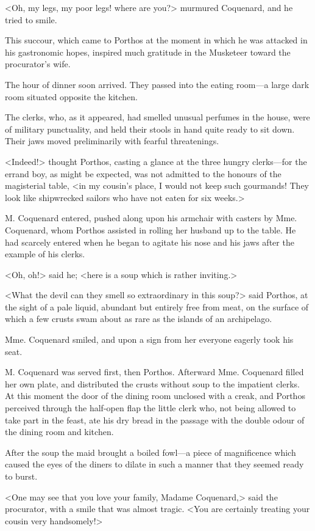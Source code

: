 <Oh, my legs, my poor legs! where are you?> murmured Coquenard, and he tried to smile. 

This succour, which came to Porthos at the moment in which he was attacked in his gastronomic hopes, inspired much gratitude in the Musketeer toward the procurator's wife. 

The hour of dinner soon arrived. They passed into the eating room---a large dark room situated opposite the kitchen. 

The clerks, who, as it appeared, had smelled unusual perfumes in the house, were of military punctuality, and held their stools in hand quite ready to sit down. Their jaws moved preliminarily with fearful threatenings. 

<Indeed!> thought Porthos, casting a glance at the three hungry clerks---for the errand boy, as might be expected, was not admitted to the honours of the magisterial table, <in my cousin's place, I would not keep such gourmands! They look like shipwrecked sailors who have not eaten for six weeks.> 

M. Coquenard entered, pushed along upon his armchair with casters by Mme. Coquenard, whom Porthos assisted in rolling her husband up to the table. He had scarcely entered when he began to agitate his nose and his jaws after the example of his clerks. 

<Oh, oh!> said he; <here is a soup which is rather inviting.> 

<What the devil can they smell so extraordinary in this soup?> said Porthos, at the sight of a pale liquid, abundant but entirely free from meat, on the surface of which a few crusts swam about as rare as the islands of an archipelago. 

Mme. Coquenard smiled, and upon a sign from her everyone eagerly took his seat. 

M. Coquenard was served first, then Porthos. Afterward Mme. Coquenard filled her own plate, and distributed the crusts without soup to the impatient clerks. At this moment the door of the dining room unclosed with a creak, and Porthos perceived through the half-open flap the little clerk who, not being allowed to take part in the feast, ate his dry bread in the passage with the double odour of the dining room and kitchen. 

After the soup the maid brought a boiled fowl---a piece of magnificence which caused the eyes of the diners to dilate in such a manner that they seemed ready to burst. 

<One may see that you love your family, Madame Coquenard,> said the procurator, with a smile that was almost tragic. <You are certainly treating your cousin very handsomely!> 

